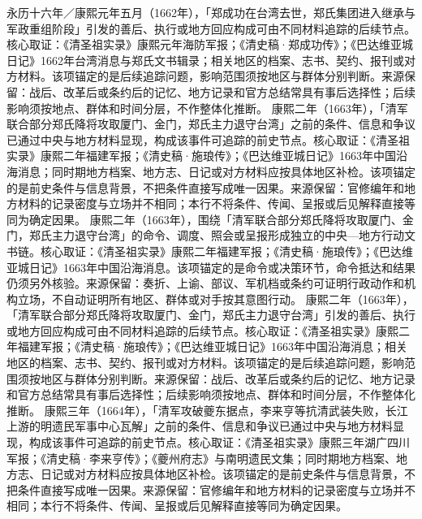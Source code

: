 永历十六年／康熙元年五月（1662年），「郑成功在台湾去世，郑氏集团进入继承与军政重组阶段」引发的善后、执行或地方回应构成可由不同材料追踪的后续节点。核心取证：《清圣祖实录》康熙元年海防军报；《清史稿·郑成功传》；《巴达维亚城日记》1662年台湾消息与郑氏文书辑录；相关地区的档案、志书、契约、报刊或对方材料。该项锚定的是后续追踪问题，影响范围须按地区与群体分别判断。来源保留：战后、改革后或条约后的记忆、地方记录和官方总结常具有事后选择性；后续影响须按地点、群体和时间分层，不作整体化推断。
康熙二年（1663年），「清军联合部分郑氏降将攻取厦门、金门，郑氏主力退守台湾」之前的条件、信息和争议已通过中央与地方材料显现，构成该事件可追踪的前史节点。核心取证：《清圣祖实录》康熙二年福建军报；《清史稿·施琅传》；《巴达维亚城日记》1663年中国沿海消息；同时期地方档案、地方志、日记或对方材料应按具体地区补检。该项锚定的是前史条件与信息背景，不把条件直接写成唯一因果。来源保留：官修编年和地方材料的记录密度与立场并不相同；本行不将条件、传闻、呈报或后见解释直接等同为确定因果。
康熙二年（1663年），围绕「清军联合部分郑氏降将攻取厦门、金门，郑氏主力退守台湾」的命令、调度、照会或呈报形成独立的中央—地方行动文书链。核心取证：《清圣祖实录》康熙二年福建军报；《清史稿·施琅传》；《巴达维亚城日记》1663年中国沿海消息。该项锚定的是命令或决策环节，命令抵达和结果仍须另外核验。来源保留：奏折、上谕、部议、军机档或条约可证明行政动作和机构立场，不自动证明所有地区、群体或对手按其意图行动。
康熙二年（1663年），「清军联合部分郑氏降将攻取厦门、金门，郑氏主力退守台湾」引发的善后、执行或地方回应构成可由不同材料追踪的后续节点。核心取证：《清圣祖实录》康熙二年福建军报；《清史稿·施琅传》；《巴达维亚城日记》1663年中国沿海消息；相关地区的档案、志书、契约、报刊或对方材料。该项锚定的是后续追踪问题，影响范围须按地区与群体分别判断。来源保留：战后、改革后或条约后的记忆、地方记录和官方总结常具有事后选择性；后续影响须按地点、群体和时间分层，不作整体化推断。
康熙三年（1664年），「清军攻破夔东据点，李来亨等抗清武装失败，长江上游的明遗民军事中心瓦解」之前的条件、信息和争议已通过中央与地方材料显现，构成该事件可追踪的前史节点。核心取证：《清圣祖实录》康熙三年湖广四川军报；《清史稿·李来亨传》；《夔州府志》与南明遗民文集；同时期地方档案、地方志、日记或对方材料应按具体地区补检。该项锚定的是前史条件与信息背景，不把条件直接写成唯一因果。来源保留：官修编年和地方材料的记录密度与立场并不相同；本行不将条件、传闻、呈报或后见解释直接等同为确定因果。
